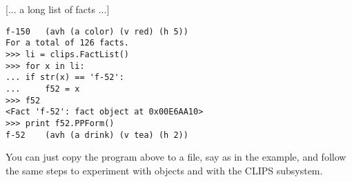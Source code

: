 [... a long list of facts ...]

\begin{verbatim}
f-150   (avh (a color) (v red) (h 5))
For a total of 126 facts.
>>> li = clips.FactList()
>>> for x in li:
...	if str(x) == 'f-52':
...		f52 = x
>>> f52
<Fact 'f-52': fact object at 0x00E6AA10>
>>> print f52.PPForm()
f-52    (avh (a drink) (v tea) (h 2))
\end{verbatim}

You can just copy the program above to a file, say  as
in the example, and follow the same steps to experiment with \pyclips{}
objects and with the CLIPS subsystem.
